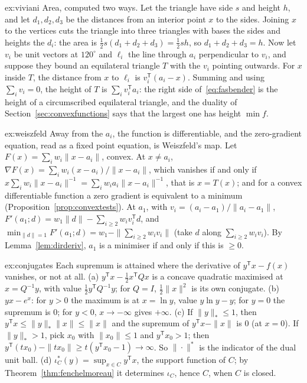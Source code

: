 \begin{solution}{ex:viviani}
\idea Area, computed two ways.
\writeup Let the triangle have side $s$ and height $h$, and let $d_1,d_2,d_3$ be the distances from an interior point $x$ to the sides. Joining $x$ to the vertices cuts the triangle into three
triangles with bases the sides and heights the $d_i$: the area is $\frac12s(d_1+d_2+d_3)=\frac12sh$, so $d_1+d_2+d_3=h$. Now let $v_i$ be unit vectors at $120^\circ$ and $\ell_i$ the line
through $a_i$ perpendicular to $v_i$, and suppose they bound an equilateral triangle $T$ with the $v_i$ pointing outwards. For $x$ inside $T$, the distance from $x$ to $\ell_i$ is
$v_i^{\mathsf T}(a_i-x)$. Summing and using $\sum_iv_i=0$, the height of $T$ is $\sum_iv_i^{\mathsf T}a_i$: the right side of~\eqref{eq:fasbender} is the height of a circumscribed
equilateral triangle, and the duality of Section~\ref{sec:convexfunctions} says that the largest one has height $\min f$.
\end{solution}

\begin{solution}{ex:weiszfeld}
\idea Away from the $a_i$, the function is differentiable, and the zero-gradient equation, read as a fixed point equation, is Weiszfeld's map.
\writeup Let $F(x)=\sum_iw_i\|x-a_i\|$, convex. At $x\ne a_i$, $\nabla F(x)=\sum_iw_i(x-a_i)/\|x-a_i\|$, which vanishes if and only if $x\sum_iw_i\|x-a_i\|^{-1}=\sum_iw_ia_i\|x-a_i\|^{-1}$, that
is $x=T(x)$; and for a convex differentiable function a zero gradient is equivalent to a minimum (Proposition~\ref{prop:convextests}). At $a_1$, with
$v_i=(a_i-a_1)/\|a_i-a_1\|$, $F'(a_1;d)=w_1\|d\|-\sum_{i\ge2}w_iv_i^{\mathsf T}d$, and $\min_{\|d\|=1}F'(a_1;d)=w_1-\|\sum_{i\ge2}w_iv_i\|$ (take $d$ along $\sum_{i\ge2}w_iv_i$). By
Lemma~\ref{lem:dirderiv}, $a_1$ is a minimiser if and only if this is $\ge0$.
\end{solution}

\begin{solution}{ex:conjugates}
\idea Each supremum is attained where the derivative of $y^{\mathsf T}x-f(x)$ vanishes, or not at all.
\writeup (a) $y^{\mathsf T}x-\frac12x^{\mathsf T}Qx$ is a concave quadratic maximised at $x=Q^{-1}y$, with value $\frac12y^{\mathsf T}Q^{-1}y$; for $Q=I$, $\frac12\|x\|^2$ is its own conjugate. (b) $yx-e^x$: for
$y>0$ the maximum is at $x=\ln y$, value $y\ln y-y$; for $y=0$ the supremum is $0$; for $y<0$, $x\to-\infty$ gives $+\infty$. (c) If $\|y\|_*\le1$, then $y^{\mathsf T}x\le\|y\|_*\|x\|\le\|x\|$ and the
supremum of $y^{\mathsf T}x-\|x\|$ is $0$ (at $x=0$). If $\|y\|_*>1$, pick $x_0$ with $\|x_0\|\le1$ and $y^{\mathsf T}x_0>1$; then $y^{\mathsf T}(tx_0)-\|tx_0\|\ge t(y^{\mathsf T}x_0-1)\to\infty$. So $\|\cdot\|^*$ is the
indicator of the dual unit ball. (d) $\iota_C^*(y)=\sup_{x\in C}y^{\mathsf T}x$, the support function of $C$; by Theorem~\ref{thm:fenchelmoreau} it determines $\iota_C$, hence $C$, when $C$ is closed.
\end{solution}

